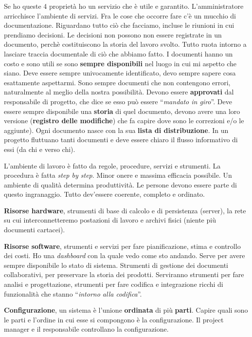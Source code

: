 Se ho queste 4 proprietà ho un servizio che è utile e garantito. L'amministratore arricchisce l'ambiente di servizi. Fra le cose che occorre fare c'è un mucchio di documentazione. Riguardano tutto ciò che facciamo, incluse le riunioni in cui prendiamo decisioni. Le decisioni non possono non essere registrate in un documento, perchè costituiscono la storia del lavoro svolto. Tutto ruota intorno a lasciare traccia documentale di ciò che abbiamo fatto. I documenti hanno un costo e sono utili se sono \textbf{sempre disponibili} nel luogo in cui mi aspetto che siano. Deve essere sempre univocamente identificato, devo sempre sapere cosa esattamente aspettarmi. Sono sempre documenti che non contengono errori, naturalmente al meglio della nostra possibilità. Devono essere \textbf{approvati} dal responsabile di progetto, che dice se esso può essere ``\textit{mandato in giro}''. Deve essere sempre disponibile una \textbf{storia} di quel documento, devono avere una loro versione (\textbf{registro delle modifiche}) che fa capire dove sono le correzioni e/o le aggiunte). Ogni documento nasce con la sua \textbf{lista di distribuzione}. In un progetto fluttuano tanti documenti e deve essere chiaro il flusso informativo di essi (da chi e verso chi).

L'ambiente di lavoro è fatto da regole, procedure, servizi e strumenti. La procedura è fatta \textit{step by step}. Minor onere e massima efficacia possibile. Un ambiente di qualità determina produttività. Le persone devono essere parte di questo ingranaggio. Tutto dev'essere coerente, completo e ordinato.

\textbf{Risorse hardware}, strumenti di base di calcolo e di persistenza (server), la rete su cui interconnetteremo postazioni di lavoro e archivi fisici (niente più documenti cartacei).

\textbf{Risorse software}, strumenti e servizi per fare pianificazione, stima e controllo dei costi. Ho una \textit{dashboard} con la quale vedo come sto andando. Serve per avere sempre disponibile lo stato di sistema. Strumenti di gestione dei documenti collaborativi, per preservare la storia dei prodotti. Serviranno strumenti per fare analisi e progettazione, strumenti per fare codifica e integrazione ricchi di funzionalità che stanno ``\textit{intorno alla codifica}''.

\textbf{Configurazione}, un sistema è l'unione \textbf{ordinata} di più \textbf{parti}. Capire quali sono le parti e l'ordine in cui esse si compongono è la configurazione. Il project manager e il responsabile controllano la configurazione.